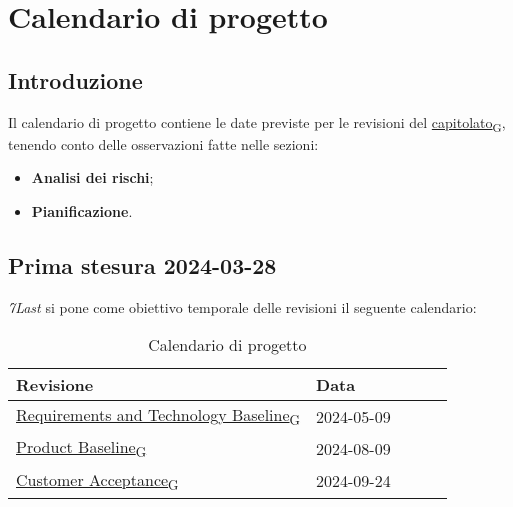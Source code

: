 \section{Calendario di progetto}
\subsection{Introduzione}
Il calendario di progetto contiene le date previste per le revisioni del \href{https://7last.github.io/docs/rtb/documentazione-interna/glossario\#capitolato}{capitolato\textsubscript{G}}, tenendo conto delle osservazioni fatte nelle sezioni:
\begin{itemize}
    \item \textbf{Analisi dei rischi};
    \item \textbf{Pianificazione}.
\end{itemize}

\subsection{Prima stesura 2024-03-28}
\textit{7Last} si pone come obiettivo temporale delle revisioni il seguente calendario:
\begin{table}[!h]
    \begin{center}
        \begin{tabular}{ | l | l | l | l | l | }
            \hline
            Revisione                               & Data       \\ \hline
            \href{https://7last.github.io/docs/rtb/documentazione-interna/glossario\#requirements-and-technology-baseline}{Requirements and Technology Baseline\textsubscript{G}}    & 2024-05-09 \\
            \href{https://7last.github.io/docs/rtb/documentazione-interna/glossario\#product-baseline}{Product Baseline\textsubscript{G}}                        & 2024-08-09 \\
            \href{https://7last.github.io/docs/rtb/documentazione-interna/glossario\#customer-acceptance}{Customer Acceptance\textsubscript{G}}                     & 2024-09-24 \\
            \hline
        \end{tabular}
    \end{center}
    \caption{Calendario di progetto}
\end{table}

